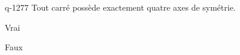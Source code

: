 \begin{truefalse}{q-1277}
Tout carré possède exactement quatre axes de symétrie.
\item* Vrai
\item Faux
\end{truefalse}

